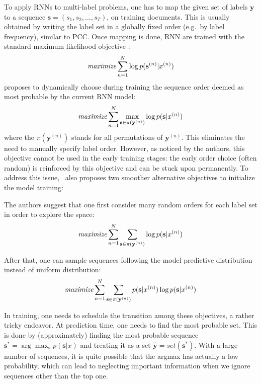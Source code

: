  
 To apply RNNs to multi-label problems, one has to map the given set of labels $\mathbf{y}$ to a sequence $\mathbf{s}=(s_1,s_2,...,s_T)$, on training documents. This is usually obtained by writing the label set in a globally fixed order (e.g.\ by label frequency), similar to PCC.
 Once mapping is done, RNN are trained with the standard maximum likelihood objective \cite{DBLP:conf/nips/NamMKF17}: 
\begin{align}
\textit{maximize} \sum_{n=1}^N \log p(\mathbf{s}^{(n)}|x^{(n)})\\
\label{eq:standard_rnn}
\end{align}
 proposes to dynamically choose during training the sequence order deemed as most probable by the current RNN model:
\begin{align}
\textit{maximize} \sum_{n=1}^N \max_{\mathbf{s}\in \pi(\mathbf{y}^{(n)})}\log p(\mathbf{s}|x^{(n)})
\label{eq:max_obj}
\end{align}
where the $\pi(\mathbf{y}^{(n)})$ stands for all  permutations of $\mathbf{y}^{(n)}$. This eliminates the need to manually specify label order.
However, as noticed by the authors, this objective cannot be used in the early training stages: the early order choice (often random) is reinforced by this objective and can be stuck upon permanently. To address this issue, ~also proposes two smoother alternative objectives to initialize the model training:

The authors suggest that one first consider many random orders for each label set in order to explore the space:
\begin{align}
\textit{maximize} \sum_{n=1}^N \sum_{\mathbf{s}\in \pi(\mathbf{y}^{(n)})}\log p(\mathbf{s}|x^{(n)})
\label{eq:wrong_obj}
\end{align} 

After that, one can sample sequences following the model predictive distribution instead of uniform distribution:
\begin{align}
\textit{maximize} \sum_{n=1}^N \sum_{\mathbf{s}\in \pi(\mathbf{y}^{(n)})}p(\mathbf{s}|x^{(n)})\log p(\mathbf{s}|x^{(n)})
\label{eq:sample_obj}
\end{align}  

In training, one needs to  schedule the transition among these objectives, a rather tricky endeavor. At prediction time, one needs to find the most probable set. This is done by (approximately) finding the most probable sequence $\mathbf{s}^*=\arg\max_\mathbf{s} p(\mathbf{s}|x)$ and treating it as a set $\hat{\mathbf{y}}=set(\mathbf{s}^*)$. With a large number of sequences, it is quite possible that the argmax has actually a low probability, which can lead to neglecting important information when we ignore sequences other than the top one.


